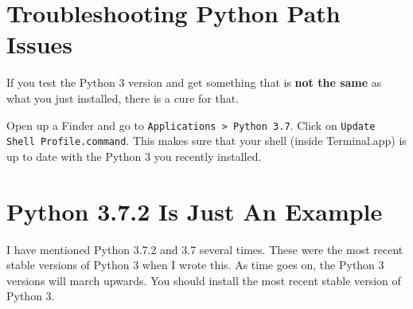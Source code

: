 \section{Troubleshooting Python Path Issues}

If you test the Python 3 version and get something that is 
\textbf{not the same} as what you just installed, there is a cure for that.

Open up a Finder and go to \texttt{Applications > Python 3.7}. Click
on \texttt{Update Shell Profile.command}. This makes sure that your
shell (inside Terminal.app) is up to date with the Python 3 you
recently installed.

\section{Python 3.7.2 Is Just An Example}

I have mentioned Python 3.7.2 and 3.7 several times. These were the
most recent stable versions of Python 3 when I wrote this. As time
goes on, the Python 3 versions will march upwards. You should install
the most recent stable version of Python 3.
